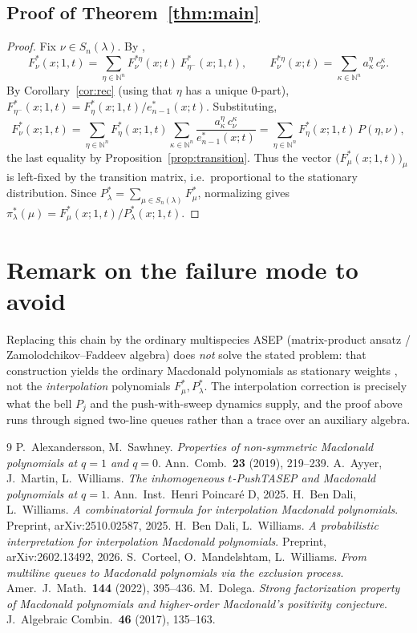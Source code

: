 \documentclass[11pt]{article}
\newcommand{\N}{\mathbb{N}}
\newcommand{\Snl}{S_n(\lambda)}
\theoremstyle{definition}
\begin{document}
\subsection*{Proof of Theorem~\ref{thm:main}}

\begin{proof}
Fix $\nu\in\Snl$. By \cite[Thm.~1.15, Lem.~5.6]{BDW25a},
\[
F^*_\nu(x;1,t)=\sum_{\eta\in\N^n}F^{*\eta}_\nu(x;t)\,F^*_{\eta^-}(x;1,t),
\qquad
F^{*\eta}_\nu(x;t)=\sum_{\kappa\in\N^n}a^\eta_\kappa\,c^\kappa_\nu .
\]
By Corollary~\ref{cor:rec} (using that $\eta$ has a unique $0$-part),
$F^*_{\eta^-}(x;1,t)=F^*_\eta(x;1,t)/e^*_{n-1}(x;t)$. Substituting,
\[
F^*_\nu(x;1,t)=\sum_{\eta\in\N^n}F^*_\eta(x;1,t)\sum_{\kappa\in\N^n}
\frac{a^\eta_\kappa\,c^\kappa_\nu}{e^*_{n-1}(x;t)}
=\sum_{\eta\in\N^n}F^*_\eta(x;1,t)\,P(\eta,\nu),
\]
the last equality by Proposition~\ref{prop:transition}. Thus the vector
$\bigl(F^*_\mu(x;1,t)\bigr)_\mu$ is left-fixed by the transition matrix, i.e.\
proportional to the stationary distribution. Since
$P^*_\lambda=\sum_{\mu\in\Snl}F^*_\mu$, normalizing gives
$\pi^*_\lambda(\mu)=F^*_\mu(x;1,t)/P^*_\lambda(x;1,t)$.
\end{proof}

\section*{Remark on the failure mode to avoid}

Replacing this chain by the ordinary multispecies ASEP (matrix-product ansatz /
Zamolodchikov--Faddeev algebra) does \emph{not} solve the stated problem: that
construction yields the ordinary Macdonald polynomials as stationary weights
\cite{CMW22,AMW25}, not the \emph{interpolation} polynomials $F^*_\mu,P^*_\lambda$.
The interpolation correction is precisely what the bell $P_j$ and the
push-with-sweep dynamics supply, and the proof above runs through signed
two-line queues rather than a trace over an auxiliary algebra.

\begin{thebibliography}{9}
 P.~Alexandersson, M.~Sawhney.
  \emph{Properties of non-symmetric Macdonald polynomials at $q=1$ and $q=0$}.
  Ann.\ Comb.\ \textbf{23} (2019), 219--239.
 A.~Ayyer, J.~Martin, L.~Williams.
  \emph{The inhomogeneous $t$-PushTASEP and Macdonald polynomials at $q=1$}.
  Ann.\ Inst.\ Henri Poincar\'e D, 2025.
 H.~Ben Dali, L.~Williams.
  \emph{A combinatorial formula for interpolation Macdonald polynomials}.
  Preprint, arXiv:2510.02587, 2025.
 H.~Ben Dali, L.~Williams.
  \emph{A probabilistic interpretation for interpolation Macdonald polynomials}.
  Preprint, arXiv:2602.13492, 2026.
 S.~Corteel, O.~Mandelshtam, L.~Williams.
  \emph{From multiline queues to Macdonald polynomials via the exclusion process}.
  Amer.\ J.\ Math.\ \textbf{144} (2022), 395--436.
 M.~Dolega.
  \emph{Strong factorization property of Macdonald polynomials and higher-order
  Macdonald's positivity conjecture}.
  J.\ Algebraic Combin.\ \textbf{46} (2017), 135--163.
\end{thebibliography}
\end{document}

